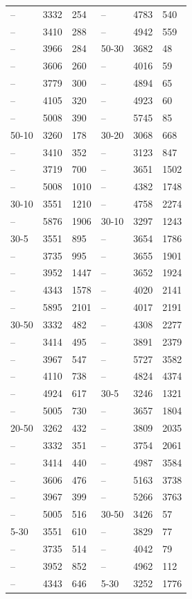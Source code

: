 \begin{xltabular}{\linewidth}{|Y|Y|Y|Y|Y|Y|}
-- & 3332 & 254 & -- & 4783 & 540\\
-- & 3410 & 288 & -- & 4942 & 559\\
-- & 3966 & 284 & 50-30 & 3682 & 48\\
-- & 3606 & 260 & -- & 4016 & 59\\
-- & 3779 & 300 & -- & 4894 & 65\\
-- & 4105 & 320 & -- & 4923 & 60\\
-- & 5008 & 390 & -- & 5745 & 85\\
50-10 & 3260 & 178 & 30-20 & 3068 & 668\\
-- & 3410 & 352 & -- & 3123 & 847\\
-- & 3719 & 700 & -- & 3651 & 1502\\
-- & 5008 & 1010 & -- & 4382 & 1748\\
30-10 & 3551 & 1210 & -- & 4758 & 2274\\
-- & 5876 & 1906 & 30-10 & 3297 & 1243\\
30-5 & 3551 & 895 & -- & 3654 & 1786\\
-- & 3735 & 995 & -- & 3655 & 1901\\
-- & 3952 & 1447 & -- & 3652 & 1924\\
-- & 4343 & 1578 & -- & 4020 & 2141\\
-- & 5895 & 2101 & -- & 4017 & 2191\\
30-50 & 3332 & 482 & -- & 4308 & 2277\\
-- & 3414 & 495 & -- & 3891 & 2379\\
-- & 3967 & 547 & -- & 5727 & 3582\\
-- & 4110 & 738 & -- & 4824 & 4374\\
-- & 4924 & 617 & 30-5 & 3246 & 1321\\
-- & 5005 & 730 & -- & 3657 & 1804\\
20-50 & 3262 & 432 & -- & 3809 & 2035\\
-- & 3332 & 351 & -- & 3754 & 2061\\
-- & 3414 & 440 & -- & 4987 & 3584\\
-- & 3606 & 476 & -- & 5163 & 3738\\
-- & 3967 & 399 & -- & 5266 & 3763\\
-- & 5005 & 516 & 30-50 & 3426 & 57\\
5-30 & 3551 & 610 & -- & 3829 & 77\\
-- & 3735 & 514 & -- & 4042 & 79\\
-- & 3952 & 852 & -- & 4962 & 112\\
-- & 4343 & 646 & 5-30 & 3252 & 1776\\

\end{xltabular}
